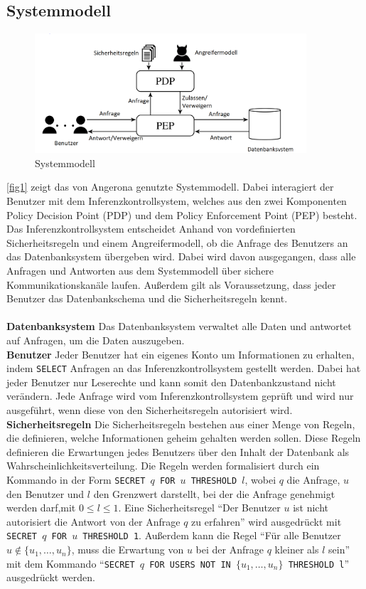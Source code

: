 \documentclass[german,version-2020-11]{uzl-thesis}
\begin{document}
\subsection{Systemmodell}
\begin{figure}[ht]
	\centering
	\includegraphics[width=0.9\textwidth]{System-model.PNG}
	\caption{Systemmodell}
	\label{fig1}
\end{figure}
\noindent 
\autoref{fig1} zeigt das von Angerona genutzte Systemmodell. Dabei interagiert der Benutzer mit dem Inferenzkontrollsystem, welches aus den zwei Komponenten Policy Decision Point (PDP) und dem Policy Enforcement Point (PEP) besteht. Das Inferenzkontrollsystem entscheidet Anhand von vordefinierten Sicherheitsregeln und einem Angreifermodell, ob die Anfrage des Benutzers an das Datenbanksystem übergeben wird. Dabei wird davon ausgegangen, dass alle Anfragen und Antworten aus dem Systemmodell über sichere Kommunikationskanäle laufen. Außerdem gilt als Voraussetzung, dass jeder Benutzer das Datenbankschema und die Sicherheitsregeln kennt. \\ \\ 
\textbf{Datenbanksystem} Das Datenbanksystem verwaltet alle Daten und antwortet auf Anfragen, um die Daten auszugeben. \\
\textbf{Benutzer} Jeder Benutzer hat ein eigenes Konto um Informationen zu erhalten, indem \texttt{SELECT} Anfragen an das Inferenzkontrollsystem gestellt werden. Dabei hat jeder Benutzer nur Leserechte und kann somit den Datenbankzustand nicht verändern. Jede Anfrage wird vom Inferenzkontrollsystem geprüft und wird nur ausgeführt, wenn diese von den Sicherheitsregeln autorisiert wird. \\ 
\textbf{Sicherheitsregeln} Die Sicherheitsregeln bestehen aus einer Menge von Regeln, die definieren, welche Informationen geheim gehalten werden sollen. Diese Regeln definieren die Erwartungen jedes Benutzers über den Inhalt der Datenbank als Wahrscheinlichkeitsverteilung. Die Regeln werden formalisiert durch ein Kommando in der Form \texttt{SECRET $q$ FOR $u$ THRESHOLD $l$}, wobei $q$ die Anfrage, $u$ den Benutzer und $l$ den Grenzwert darstellt, bei der die Anfrage genehmigt werden darf,mit $0 \leq l \leq 1$. Eine Sicherheitsregel \enquote{Der Benutzer $u$ ist nicht autorisiert die Antwort von der Anfrage $q$ zu erfahren} wird ausgedrückt mit \texttt{SECRET $q$ FOR $u$ THRESHOLD 1}. Außerdem kann die Regel \enquote{Für alle Benutzer $u \notin \{u_1,\dots,u_n\}$, muss die Erwartung von $u$ bei der Anfrage $q$ kleiner als $l$ sein} mit dem Kommando \enquote{\texttt{SECRET $q$ FOR USERS NOT IN $\{u_1,\dots,u_n\}$ THRESHOLD l}} ausgedrückt werden.\\ 
\end{document}
